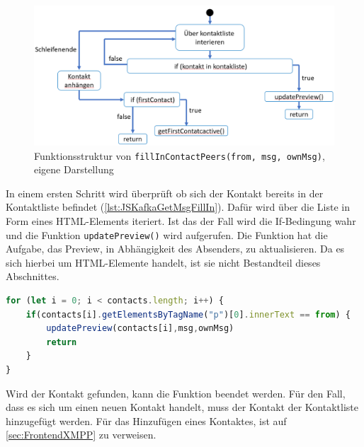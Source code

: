 \documentclass[a4paper,titlepage,halfparskip,12pt]{scrreprt}
\begin{document}
\begin{onehalfspacing}
\begin{figure}[h]
	\centering
	\includegraphics[scale=0.6]{images/fillInContactPeersKafka}
	\caption{Funktionsstruktur von \texttt{fillInContactPeers(from, msg, ownMsg)}, eigene Darstellung}
	\label{img:fillInContactPeersKafka}
\end{figure}
In einem ersten Schritt wird überprüft ob sich der Kontakt bereits in der Kontaktliste befindet (\autoref{lst:JSKafkaGetMsgFillIn}). Dafür wird über die Liste in Form eines HTML-Elements iteriert. Ist das der Fall wird die If-Bedingung wahr und die Funktion \texttt{updatePreview()} wird aufgerufen. Die Funktion hat die Aufgabe, das Preview, in Abhängigkeit des Absenders, zu aktualisieren. Da es sich hierbei um HTML-Elemente handelt, ist sie nicht Bestandteil dieses Abschnittes.
\begin{lstlisting}[language=Javascript,caption=Überprüfung ob der Kontakt bereits in der Liste ist,label={lst:JSKafkaGetMsgFillIn}]
for (let i = 0; i < contacts.length; i++) {
	if(contacts[i].getElementsByTagName("p")[0].innerText == from) {
		updatePreview(contacts[i],msg,ownMsg)
		return
	} 
}
\end{lstlisting}
Wird der Kontakt gefunden, kann die Funktion beendet werden. Für den Fall, dass es sich um einen neuen Kontakt handelt, muss der Kontakt der Kontaktliste hinzugefügt werden. Für das Hinzufügen eines Kontaktes, ist auf \autoref{sec:FrontendXMPP} zu verweisen.\\

\end{onehalfspacing}
\end{document}

